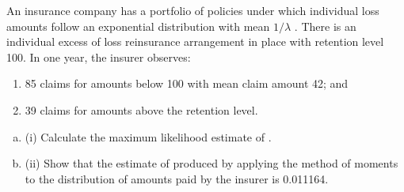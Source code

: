 \documentclass[a4paper,12pt]{article}
\begin{document}
An insurance company has a portfolio of policies under which individual loss amounts follow an exponential distribution with mean $1/ \lambda$  . There is an individual excess of loss reinsurance arrangement in place with retention level 100. In one year,
the insurer observes:
\begin{enumerate}
\item 85 claims for amounts below 100 with mean claim amount 42; and
\item 39 claims for amounts above the retention level.
\end{enumerate}

\begin{enumerate}[(a)]
\item (i) Calculate the maximum likelihood estimate of \lambda  .
\item (ii) Show that the estimate of \lambda  produced by applying the method of moments to
the distribution of amounts paid by the insurer is 0.011164.
\end{enumerate}
\end{document}
